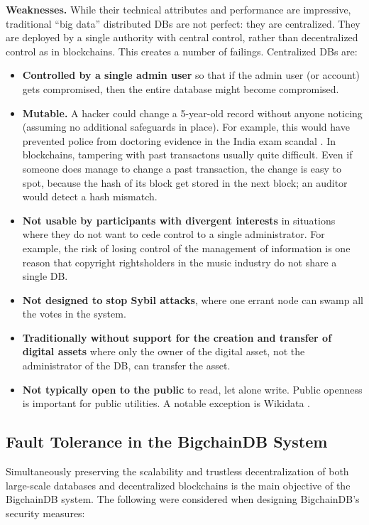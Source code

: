 \medskip
\noindent\textbf{Weaknesses.} While their technical attributes and performance are impressive, traditional “big data” distributed DBs are not perfect: they are centralized.
They are deployed by a single authority with central control, rather than decentralized control as in blockchains.
This creates a number of failings.
Centralized DBs are:
\begin{itemize}
  \item \textbf{Controlled by a single admin user} so that if the admin user (or account) gets compromised, then the entire database might become compromised.
  \item \textbf{Mutable.} A hacker could change a 5-year-old record without anyone noticing (assuming no additional safeguards in place). For example, this would have prevented police from doctoring evidence in the India exam scandal \cite{sethy2015india_scam}. In blockchains, tampering with past transactons usually quite difficult. Even if someone does manage to change a past transaction, the change is easy to spot, because the hash of its block get stored in the next block; an auditor would detect a hash mismatch.
  \item \textbf{Not usable by participants with divergent interests} in situations where they do not want to cede control to a single administrator. For example, the risk of losing control of the management of information is one reason that copyright rightsholders in the music industry do not share a single DB.
  \item \textbf{Not designed to stop Sybil attacks}, where one errant node can swamp all the votes in the system.
  \item \textbf{Traditionally without support for the creation and transfer of digital assets} where only the owner of the digital asset, not the administrator of the DB, can transfer the asset.
  \item \textbf{Not typically open to the public} to read, let alone write. Public openness is important for public utilities. A notable exception is Wikidata \cite{wikidata}.
\end{itemize}

\subsection{Fault Tolerance in the BigchainDB System}

Simultaneously preserving the scalability and trustless decentralization of both large-scale databases and decentralized blockchains is the main objective of the BigchainDB system. The following were considered when designing BigchainDB's security measures:


